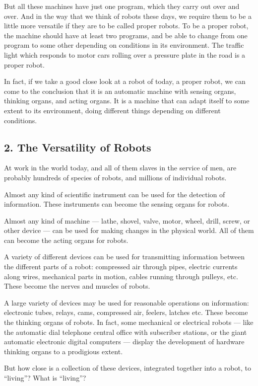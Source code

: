 \documentclass[11pt]{article}
\begin{document}
But all these machines have just one program, which they carry out over and
over. And in the way that we think of robots these days, we require them to be
a little more versatile if they are to be called proper robots. To be a proper
robot, the machine should have at least two programs, and be able to change
from one program to some other depending on conditions in its environment. The
traffic light which responds to motor cars rolling over a pressure plate in the
road is a proper robot.

In fact, if we take a good close look at a robot of today, a proper robot, we
can come to the conclusion that it is an automatic machine with sensing organs,
thinking organs, and acting organs. It is a machine that can adapt itself to
some extent to its environment, doing different things depending on different
conditions.

\subsection*{2. The Versatility of Robots}

At work in the world today, and all of them slaves in the service of men, are
probably hundreds of species of robots, and millions of individual robots.

Almost any kind of scientific instrument can be used for the detection of
information. These instruments can become the sensing organs for robots.

Almost any kind of machine --- lathe, shovel, valve, motor, wheel, drill,
screw, or other device --- can be used for making changes in the physical
world. All of them can become the acting organs for robots.

A variety of different devices can be used for transmitting information between
the different parts of a robot: compressed air through pipes, electric currents
along wires, mechanical parts in motion, cables running through pulleys, etc.
These become the nerves and muscles of robots.

A large variety of devices may be used for reasonable operations on
information: electronic tubes, relays, cams, compressed air, feelers, latches
etc. These become the thinking organs of robots. In fact, some mechanical or
electrical robots --- like the automatic dial telephone central office with
subscriber stations, or the giant automatic electronic digital computers ---
display the development of hardware thinking organs to a prodigious extent.

But how close is a collection of these devices, integrated together into a
robot, to ``living''? What is ``living''?
\end{document}
